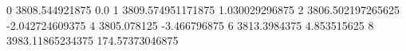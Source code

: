 0 3808.544921875 0.0
1 3809.574951171875 1.030029296875
2 3806.502197265625 -2.042724609375
4 3805.078125 -3.466796875
6 3813.3984375 4.853515625
8 3983.11865234375 174.57373046875
